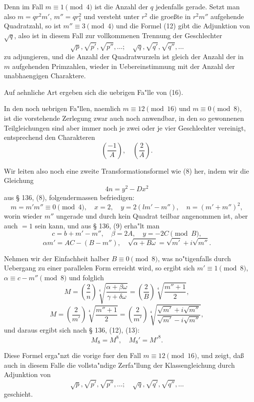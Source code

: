 \documentclass[12pt,a4paper]{article}
\theoremstyle{plain}
\theoremstyle{definition}
\theoremstyle{remark}
\begin{document}
Denn im Fall $m \equiv 1 \pmod{4}$ ist die Anzahl der $q$ jedenfalls gerade. Setzt man also $m = qr^2 m'$, $m'' = qr_1^2$ und versteht unter $r^2$ die groe\ss{}te in $r^2 m''$ aufgehende Quadratzahl, so ist $m'' \equiv 3 \pmod{4}$ und die Formel (12) gibt die Adjunktion von $\sqrt{q}$, also ist in diesem Fall zur vollkommenen Trennung der Geschlechter
\[
\sqrt{p}, \sqrt{p'}, \sqrt{p''}, \ldots; \quad \sqrt{q}, \sqrt{q'}, \sqrt{q''}, \ldots
\]
zu adjungieren, und die Anzahl der Quadratwurzeln ist gleich der Anzahl der in $m$ aufgehenden Primzahlen, wieder in Uebereinstimmung mit der Anzahl der unabhaengigen Charaktere.

Auf aehnliche Art ergeben sich die uebrigen Fa"lle von (16).

In den noch uebrigen Fa"llen, naemlich $m \equiv 12 \pmod{16}$ und $m \equiv 0 \pmod{8}$, ist die vorstehende Zerlegung zwar auch noch anwendbar, in den so gewonnenen Teilgleichungen sind aber immer noch je zwei oder je vier Geschlechter vereinigt, entsprechend den Charakteren
\[
\left(\frac{-1}{A}\right), \quad \left(\frac{2}{A}\right).
\]

Wir leiten also noch eine zweite Transformationsformel wie (8) her, indem wir die Gleichung
\[
4n = y^2 - Dx^2
\]
aus \S{} 136, (8), folgendermassen befriedigen:
\[
m = m'm'' \equiv 0 \pmod{4}, \quad x = 2, \quad y = 2(lm' - m''), \quad n = (m' + m'')^2,
\]
worin wieder $m''$ ungerade und durch kein Quadrat teilbar angenommen ist, aber auch $= 1$ sein kann, und aus \S{} 136, (9) erha"lt man
\[
c = b + m' - m'', \quad \beta = 2A, \quad y = -2C \pmod{B},
\]
\[
\alpha m' = AC - (B - m''), \quad \sqrt{\alpha + B\omega} = \sqrt{m'} + i\sqrt{m''}.
\]

Nehmen wir der Einfachheit halber $B \equiv 0 \pmod{8}$, was no"tigenfalls durch Uebergang zu einer parallelen Form erreicht wird, so ergibt sich $m' \equiv 1 \pmod{8}$, $\alpha \equiv c - m'' \pmod{8}$ und folglich
\[
M = \left(\frac{2}{n}\right) \sqrt[4]{\frac{\alpha + \beta\omega}{\gamma + \delta\omega}} = \left(\frac{2}{B}\right) \sqrt[4]{\frac{m'' + 1}{2}},
\]
\[
M = \left(\frac{2}{m'}\right) \sqrt[4]{\frac{m'' + 1}{2}} = \left(\frac{2}{m'}\right) \sqrt[4]{\frac{\sqrt{m'} + i\sqrt{m''}}{\sqrt{m'} - i\sqrt{m''}}},
\]
und daraus ergibt sich nach \S{} 136, (12), (13):
\[
M_8 = M^8, \quad M_8' = M'^8.
\]

Diese Formel erga"nzt die vorige fuer den Fall $m \equiv 12 \pmod{16}$, und zeigt, da\ss{} auch in diesem Falle die vollsta"ndige Zerfa"llung der Klassengleichung durch Adjunktion von
\[
\sqrt{p}, \sqrt{p'}, \sqrt{p''}, \ldots; \quad \sqrt{q}, \sqrt{q'}, \sqrt{q''}, \ldots
\]
geschieht.

\newpage
\end{document}
